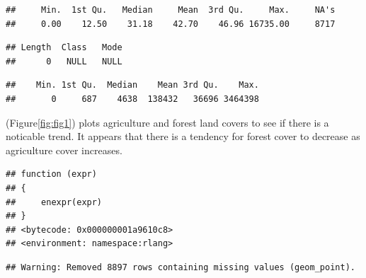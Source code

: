 \documentclass[12pt,]{article}
\newenvironment{Shaded}{\begin{snugshade}}{\end{snugshade}}
\newcommand{\KeywordTok}[1]{\textcolor[rgb]{0.13,0.29,0.53}{\textbf{#1}}}
\newcommand{\OperatorTok}[1]{\textcolor[rgb]{0.81,0.36,0.00}{\textbf{#1}}}
\newcommand{\NormalTok}[1]{#1}
\begin{document}
\begin{Shaded}
\end{Shaded}

\begin{verbatim}
##     Min.  1st Qu.   Median     Mean  3rd Qu.     Max.     NA's 
##     0.00    12.50    31.18    42.70    46.96 16735.00     8717
\end{verbatim}

\begin{Shaded}
\end{Shaded}

\begin{verbatim}
## Length  Class   Mode 
##      0   NULL   NULL
\end{verbatim}

\begin{Shaded}
\end{Shaded}

\begin{verbatim}
##    Min. 1st Qu.  Median    Mean 3rd Qu.    Max. 
##       0     687    4638  138432   36696 3464398
\end{verbatim}

(Figure\ref{fig:fig1}) plots agriculture and forest land covers to see
if there is a noticable trend. It appears that there is a tendency for
forest cover to decrease as agriculture cover increases.

\begin{verbatim}
## function (expr) 
## {
##     enexpr(expr)
## }
## <bytecode: 0x000000001a9610c8>
## <environment: namespace:rlang>
\end{verbatim}

\begin{verbatim}
## Warning: Removed 8897 rows containing missing values (geom_point).
\end{verbatim}
\end{document}
